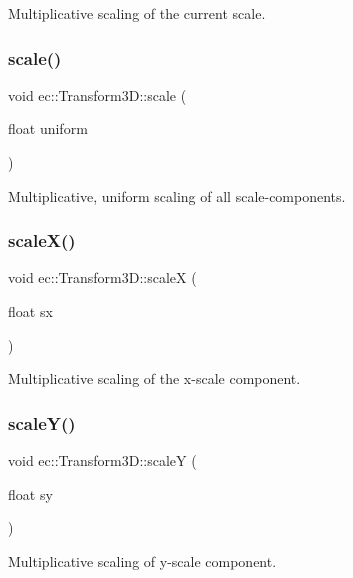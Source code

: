 Multiplicative scaling of the current scale. \mbox{\label{classec_1_1_transform3_d_af4798de480a697351333d068a90ab69e}} 
\subsubsection{\texorpdfstring{scale()}{scale()}\hspace{0.1cm}{\footnotesize\ttfamily [3/3]}}
{\footnotesize\ttfamily void ec\+::\+Transform3\+D\+::scale (\begin{DoxyParamCaption}\item[{float}]{uniform }\end{DoxyParamCaption})}

Multiplicative, uniform scaling of all scale-\/components. \mbox{\label{classec_1_1_transform3_d_a3b859bc4f4b47e9d4b1e322c811a9e29}} 
\subsubsection{\texorpdfstring{scale\+X()}{scaleX()}}
{\footnotesize\ttfamily void ec\+::\+Transform3\+D\+::scaleX (\begin{DoxyParamCaption}\item[{float}]{sx }\end{DoxyParamCaption})}

Multiplicative scaling of the x-\/scale component. \mbox{\label{classec_1_1_transform3_d_a2b15e39c5a79379c361fb515a163c6de}} 
\subsubsection{\texorpdfstring{scale\+Y()}{scaleY()}}
{\footnotesize\ttfamily void ec\+::\+Transform3\+D\+::scaleY (\begin{DoxyParamCaption}\item[{float}]{sy }\end{DoxyParamCaption})}

Multiplicative scaling of y-\/scale component. \mbox{\label{classec_1_1_transform3_d_a61b556423d4c5dffd55f40685b0cb777}} 
